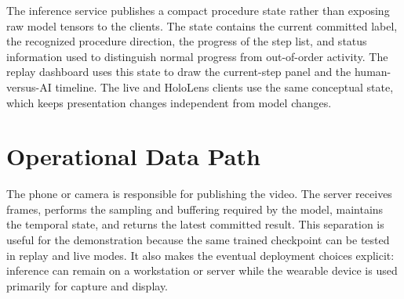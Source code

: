 The inference service publishes a compact procedure state rather than exposing
raw model tensors to the clients. The state contains the current committed
label, the recognized procedure direction, the progress of the step list, and
status information used to distinguish normal progress from out-of-order
activity. The replay dashboard uses this state to draw the current-step panel
and the human-versus-AI timeline. The live and HoloLens clients use the same
conceptual state, which keeps presentation changes independent from model
changes.

\section{Operational Data Path}

The phone or camera is responsible for publishing the video. The server
receives frames, performs the sampling and buffering required by the model,
maintains the temporal state, and returns the latest committed result. This
separation is useful for the demonstration because the same trained checkpoint
can be tested in replay and live modes. It also makes the eventual deployment
choices explicit: inference can remain on a workstation or server while the
wearable device is used primarily for capture and display.
